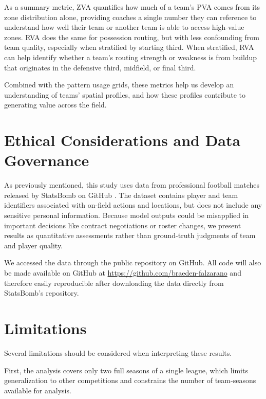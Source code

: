 \documentclass[12pt,a4paper]{article}
\begin{document}
As a summary metric, ZVA quantifies how much of a team's PVA comes from its zone distribution alone, providing coaches a single number they can reference to understand how well their team or another team is able to access high-value zones. RVA does the same for possession routing, but with less confounding from team quality, especially when stratified by starting third. When stratified, RVA can help identify whether a team's routing strength or weakness is from buildup that originates in the defensive third, midfield, or final third. 

Combined with the pattern usage grids, these metrics help us develop an understanding of teams' spatial profiles, and how these profiles contribute to generating value across the field.

\section{Ethical Considerations and Data Governance}

As previously mentioned, this study uses data from professional football matches released by StatsBomb on GitHub \cite{statsbomb_open_data}. The dataset contains player and team identifiers associated with on-field actions and locations, but does not include any sensitive personal information. Because model outputs could be misapplied in important decisions like contract negotiations or roster changes, we present results as quantitative assessments rather than ground-truth judgments of team and player quality.

We accessed the data through the public repository on GitHub. All code will also be made available on GitHub at \url{https://github.com/braeden-falzarano} and therefore easily reproducible after downloading the data directly from StatsBomb’s repository.

\section{Limitations}

Several limitations should be considered when interpreting these results. 

First, the analysis covers only two full seasons of a single league, which limits generalization to other competitions and constrains the number of team-seasons available for analysis.
\end{document}

